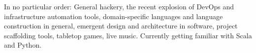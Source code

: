 \documentclass[10pt,a4paper]{article}
\begin{document}
\spacedhrule{1.6em}{-0.4em}

\inlineheadsection
  {In no particular order:}
  {
    General hackery, the recent explosion of DevOps and infrastructure automation tools, domain-specific languages and language construction in general,
    emergent design and architecture in software, project scaffolding tools, tabletop games, live music.  Currently getting familiar with Scala and Python.
  }
\end{document}
